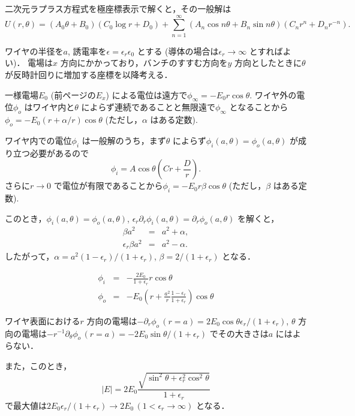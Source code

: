 \documentclass{jsarticle}
\begin{document}
\newpage

二次元ラプラス方程式を極座標表示で解くと，その一般解は
\begin{equation}
U(r, \theta) = (A_0\theta + B_0)(C_0\log r + D_0)  + \sum_{n = 1}^\infty (A_n\cos n\theta + B_n\sin n\theta)(C_n r^n + D_n r^{-n}).
\end{equation}

ワイヤの半径を$a$, 誘電率を$\epsilon = \epsilon_r \epsilon_0$ とする (導体の場合は$\epsilon_r\to\infty$ とすればよい)．
電場は$x$ 方向にかかっており，バンチのすすむ方向を$y$ 方向としたときに$\theta$ が反時計回りに増加する座標を以降考える．

一様電場$E_0$ (前ページの$E_x$) による電位は遠方で$\phi_\infty = -E_0r\cos\theta$.
ワイヤ外の電位$\phi_o$ はワイヤ内と$\theta$ によらず連続であることと無限遠で$\phi_\infty$ となることから$\phi_o = -E_0(r + \alpha/r)\cos\theta$ (ただし，$\alpha$ はある定数).

ワイヤ内での電位$\phi_i$ は一般解のうち，まず$\theta$ によらず$\phi_i(a,\theta) = \phi_o(a,\theta)$ が成り立つ必要があるので
\begin{equation}
\phi_i = A\cos\theta (Cr + \frac{D}{r}).
\end{equation}
さらに$r\to 0$ で電位が有限であることから$\phi_i = -E_0r\beta\cos\theta$ (ただし，$\beta$ はある定数).


このとき，$\phi_i(a,\theta) = \phi_o(a,\theta)$, $\epsilon_r\partial_r\phi_i(a, \theta) = \partial_r\phi_o(a, \theta)$ を解くと，
\begin{eqnarray}
\beta a^2 &=& a^2 + \alpha, \\
\epsilon_r \beta a^2 &=& a^2 - \alpha.
\end{eqnarray}
したがって，$\alpha = a^2(1-\epsilon_r)/(1+\epsilon_r)$, $\beta = 2/(1+\epsilon_r)$ となる．

\begin{eqnarray}
\phi_i &=& - \frac{2 E_0}{1+\epsilon_r} r \cos\theta \\ 
\phi_o &=& -E_0\left(r + \frac{a^2}{r}\frac{1-\epsilon_r}{1+\epsilon_r}\right) \cos\theta
\end{eqnarray}

ワイヤ表面における$r$ 方向の電場は$-\partial_r\phi_o\,(r = a) = 2E_0\cos\theta\epsilon_r/(1+\epsilon_r)$, $\theta$ 方向の電場は$-r^{-1}\partial_\theta\phi_o\,(r = a) = -2E_0\sin\theta/(1+\epsilon_r)$ でその大きさは$a$ にはよらない．

また，このとき，
\begin{equation}
|E| = 2E_0\frac{\sqrt{\sin^2\theta + \epsilon_r^2\cos^2\theta}}{1 + \epsilon_r}
\end{equation}
で最大値は$2E_0\epsilon_r/(1+\epsilon_r)\to2E_0\,(1<\epsilon_r\to\infty)$ となる．
\end{document}
